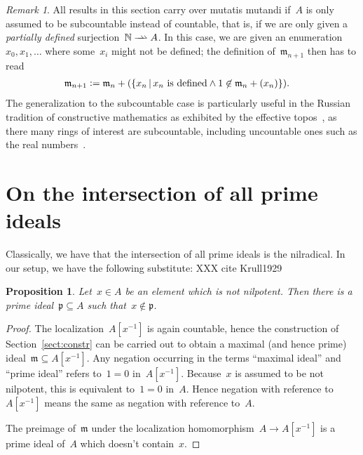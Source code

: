 \documentclass[oneside,reqno]{amsart}
\theoremstyle{definition}
\theoremstyle{plain}
\newtheorem{prop}[defn]{Proposition}
\theoremstyle{remark}
\newtheorem{rem}[defn]{Remark}
\newcommand{\mmm}{\mathfrak{m}}
\newcommand{\ppp}{\mathfrak{p}}
\newcommand{\NN}{\mathbb{N}}
\newcommand{\defeq}{\vcentcolon=}
\renewcommand{\_}{\mathpunct{.}\,}
\begin{document}
\newcommand{\rightrightharpoonup}{\mathrel{\mathrlap{\rightharpoonup}\mkern1mu\rightharpoonup}}
\begin{rem}All results in this section carry over mutatis mutandi if~$A$ is
only assumed to be subcountable instead of countable, that is, if we are only
given a \emph{partially defined} surjection~$\NN \rightrightharpoonup A$. In
this case, we are given an enumeration~$x_0,x_1,\ldots$ where some~$x_i$
might not be defined; the definition of~$\mmm_{n+1}$ then has to read
\begin{align*}
  \mmm_{n+1} &\defeq \mmm_n + (\{ x_n \,|\, \text{$x_n$ is defined} \wedge 1 \not\in \mmm_n + (x_n) \}).
\end{align*}
The generalization to the subcountable case is particularly useful in the
Russian tradition of constructive mathematics as exhibited by the ef{}fective
topos~\cite{hyland:effective-topos,oosten:realizability,phoa:effective,bauer:c2c},
as there many rings of interest are subcountable, including uncountable ones such as the real
numbers~\cite[Prop.~7.2]{hyland:effective-topos}.
\end{rem}


\section{On the intersection of all prime ideals}

Classically, we have that the intersection of all prime ideals is the
nilradical. In our setup, we have the following substitute:
XXX cite Krull1929

\begin{prop}\label{prop:nilp-prime}Let~$x \in A$ be an element which is not nilpotent. Then there is a
prime ideal~$\ppp \subseteq A$ such that~$x \not\in \ppp$.
\end{prop}

\begin{proof}The localization~$A[x^{-1}]$ is again countable, hence the
construction of Section~\ref{sect:constr} can be carried out to obtain a
maximal (and hence prime) ideal~$\mmm \subseteq A[x^{-1}]$. Any negation
occurring in the terms ``maximal ideal'' and ``prime ideal'' refers to~$1 = 0$
in~$A[x^{-1}]$. Because~$x$ is assumed to be not nilpotent, this is equivalent
to~$1 = 0$ in~$A$. Hence negation with reference to~$A[x^{-1}]$ means the same
as negation with reference to~$A$.

The preimage of~$\mmm$ under the localization homomorphism~$A \to A[x^{-1}]$ is
a prime ideal of~$A$ which doesn't contain~$x$.
\end{proof}
\end{document}

